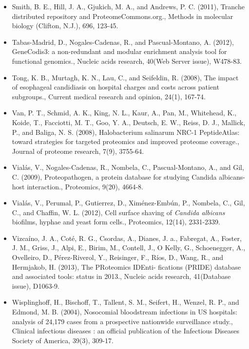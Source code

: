 \begin{itemize}[leftmargin=*]
\item[]{
Smith, B. E., Hill, J. A., Gjukich, M. A., and Andrews, P. C. (2011), Tranche 
distributed repository and ProteomeCommons.org., Methods in molecular biology (Clifton, N.J.), 696,
123-45.
}

\item[]{
Tabas-Madrid, D., Nogales-Cadenas, R., and Pascual-Montano, A. (2012), GeneCodis3: a
non-redundant and modular enrichment analysis tool for functional genomics., Nucleic acids
research, 40(Web Server issue), W478-83.
}

\item[]{
Tong, K. B., Murtagh, K. N., Lau, C., and Seifeldin, R. (2008), The impact of esophageal 
candidiasis on hospital charges and costs across patient subgroups., Current medical research
and opinion, 24(1), 167-74.
}

\item[]{
Van, P. T., Schmid, A. K., King, N. L., Kaur, A., Pan, M., Whitehead, K., Koide, T., Facciotti,
M. T., Goo, Y. A., Deutsch, E. W., Reiss, D. J., Mallick, P., and Baliga, N. S. (2008), 
Halobacterium salinarum NRC-1 PeptideAtlas: toward strategies for targeted proteomics and
improved proteome coverage., Journal of proteome research, 7(9), 3755-64.
}

\item[]{
Vial\'as, V., Nogales-Cadenas, R., Nombela, C., Pascual-Montano, A., and Gil, C. (2009), 
Proteopathogen, a protein database for studying Candida albicans-host interaction., 
Proteomics, 9(20), 4664-8.
}

\item[]{
Vial\'as, V., Perumal, P., Gutierrez, D., Xim\'enez-Emb\'un, P., Nombela, C., Gil, C., and Chaffin,
W. L. (2012), Cell surface shaving of \textit{Candida albicans} biofilms, hyphae and yeast form
cells., Proteomics, 12(14), 2331-2339.
}

\item[]{
Vizca\'ino, J. A., Cot\'e, R. G., Csordas, A., Dianes, J. a., Fabregat, A., Foster, J. M., Griss, J.,
Alpi, E., Birim, M., Contell, J., O Kelly, G., Schoenegger, A., Ovelleiro, D., P\'erez-Riverol,
Y., Reisinger, F., R\'ios, D., Wang, R., and Hermjakob, H. (2013), The PRoteomics IDEnti-
fications (PRIDE) database and associated tools: status in 2013., Nucleic acids research,
41(Database issue), D1063-9.
}

\item[]{
Wisplinghoff, H., Bischoff, T., Tallent, S. M., Seifert, H., Wenzel, R. P., and Edmond, M. B.
(2004), Nosocomial bloodstream infections in US hospitals: analysis of 24,179 cases from
a prospective nationwide surveillance study., Clinical infectious diseases : an official 
publication of the Infectious Diseases Society of America, 39(3), 309-17.
}



\end{itemize}
